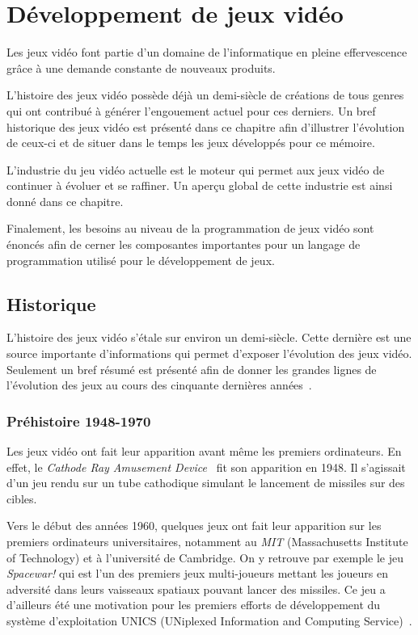 \documentclass[12pt,twoside,letterpaper,francais]{book}
\begin{document}
\chapter{Dévelop\-pement de jeux vidéo} \label{Chap:JV}
Les jeux vidéo font partie d'un domaine de l'informatique en pleine
effervescence grâce à une demande constante de nouveaux produits.

L'histoire des jeux vidéo possède déjà un demi-siècle de créations de
tous genres qui ont contribué à générer l'engouement actuel pour ces
derniers. Un bref historique des jeux vidéo est présenté dans ce
chapitre afin d'illustrer l'évolution de ceux-ci et de situer
dans le temps les jeux développés pour ce mémoire.

L'industrie du jeu vidéo actuelle est le moteur qui permet aux jeux
vidéo de continuer à évoluer et se raffiner. Un aperçu global de cette
industrie est ainsi donné dans ce chapitre.

Finalement, les besoins au niveau de la programmation de jeux vidéo
sont énoncés afin de cerner les composantes importantes pour un
langage de programmation utilisé pour le dévelop\-pement de jeux.


\FloatBarrier
\section{Historique}
L'histoire des jeux vidéo s'étale sur environ un demi-siècle. Cette
dernière est une source importante d'informations qui permet d'exposer
l'évolution des jeux vidéo. Seulement un bref résumé est présenté afin
de donner les grandes lignes de l'évolution des jeux au cours des
cinquante dernières années~\cite{VIDEOGAMES_history,HISCORE}.

\FloatBarrier
\subsection{Préhistoire 1948-1970}
Les jeux vidéo ont fait leur apparition avant même les premiers
ordinateurs. En effet, le \textit{Cathode Ray Amusement
  Device}~\cite{CRTAD} fit son apparition en 1948. Il s'agissait d'un
jeu rendu sur un tube cathodique simulant le lancement de missiles sur
des cibles.

Vers le début des années 1960, quelques jeux ont fait leur apparition
sur les premiers ordinateurs universitaires, notamment au \textit{MIT}
(Massachusetts Institute of Technology) et à l'université de
Cambridge. On y retrouve par exemple le jeu \textit{Spacewar!} qui est
l'un des premiers jeux multi-joueurs mettant les joueurs en adversité
dans leurs vaisseaux spatiaux pouvant lancer des missiles. Ce jeu a
d'ailleurs été une motivation pour les premiers efforts de
dévelop\-pement du système d'exploitation UNICS (UNiplexed Information
and Computing Service)~\cite{SPACEWAR-UNICS}.
\end{document}
